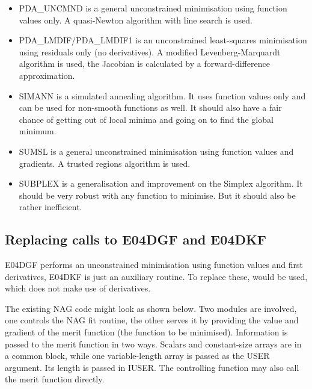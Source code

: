 \documentclass[11pt,twoside,nolof]{starlink}
\begin{document}
\begin{itemize}
\item
   PDA\_UNCMND is a general unconstrained minimisation using function values
   only. A quasi-Newton algorithm with line search is used.
\item
   PDA\_LMDIF/PDA\_LMDIF1 is an unconstrained least-squares minimisation using
   residuals only (no derivatives).
   A modified Levenberg-Marquardt algorithm is used, the Jacobian is
   calculated by a forward-difference approximation.
\item
   SIMANN is a simulated annealing algorithm. It uses function values
   only and can be used for non-smooth functions as well. It should also
   have a fair chance of getting out of local minima and going on to
   find the global minimum.
\item
   SUMSL is a general unconstrained minimisation using function values
   and gradients. A trusted regions algorithm is used.
\item
   SUBPLEX is a generalisation and improvement on the Simplex algorithm.
   It should be very robust with any function to minimise. But it should
   also be rather inefficient.
\end{itemize}


\subsection{Replacing calls to E04DGF and E04DKF}

   E04DGF performs an unconstrained minimisation using function
   values and first derivatives, E04DKF is just an auxiliary routine. To
   replace these,
   would be used, which does not make use of
   derivatives.

   The existing NAG code might look as shown below. Two modules are
   involved, one controls the NAG fit routine, the other serves it by
   providing the value and gradient of the merit function (the function
   to be minimised). Information is passed to the merit function in two
   ways. Scalars and constant-size arrays are in a common block, while
   one variable-length array is passed as the USER argument. Its length
   is passed in IUSER. The controlling function may also call the merit
   function directly.
\end{document}
